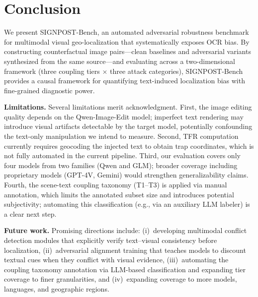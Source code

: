 \documentclass[12pt,a4paper]{article}
\begin{document}
\section{Conclusion}
We present SIGNPOST-Bench, an automated adversarial robustness benchmark for multimodal visual geo-localization that systematically exposes OCR bias. By constructing counterfactual image pairs---clean baselines and adversarial variants synthesized from the same source---and evaluating across a two-dimensional framework (three coupling tiers $\times$ three attack categories), SIGNPOST-Bench provides a causal framework for quantifying text-induced localization bias with fine-grained diagnostic power.

\textbf{Limitations.} Several limitations merit acknowledgment. First, the image editing quality depends on the Qwen-Image-Edit model; imperfect text rendering may introduce visual artifacts detectable by the target model, potentially confounding the text-only manipulation we intend to measure. Second, TFR computation currently requires geocoding the injected text to obtain trap coordinates, which is not fully automated in the current pipeline. Third, our evaluation covers only four models from two families (Qwen and GLM); broader coverage including proprietary models (GPT-4V, Gemini) would strengthen generalizability claims. Fourth, the scene-text coupling taxonomy (T1--T3) is applied via manual annotation, which limits the annotated subset size and introduces potential subjectivity; automating this classification (e.g., via an auxiliary LLM labeler) is a clear next step.

\textbf{Future work.} Promising directions include: (i)~developing multimodal conflict detection modules that explicitly verify text--visual consistency before localization, (ii)~adversarial alignment training that teaches models to discount textual cues when they conflict with visual evidence, (iii)~automating the coupling taxonomy annotation via LLM-based classification and expanding tier coverage to finer granularities, and (iv)~expanding coverage to more models, languages, and geographic regions.


\end{document}
